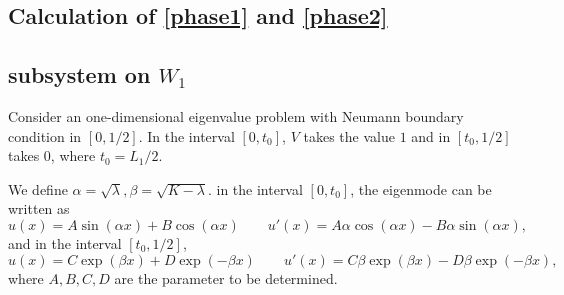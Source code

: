 \documentclass[a4paper,11pt]{article}
\begin{document}
\begin{appendices}
\section{Calculation of \eqref{phase1} and \eqref{phase2}}\label{AppendixC}

\subsection{subsystem on $W_1$}

Consider an one-dimensional eigenvalue problem with Neumann boundary condition in $[0, 1/2]$. In the interval $[0, t_0]$, $V$ takes the value $1$ and in $[t_0, 1/2]$ takes $0$, where $t_0 = L_1/2$.

We define $\alpha = \sqrt{\lambda}, \beta = \sqrt{K - \lambda}$. in the interval $[0, t_0]$, the eigenmode can be written as
\begin{equation*}
u(x) = A \sin(\alpha x) + B \cos(\alpha x) \qquad u'(x) = A \alpha \cos(\alpha x) - B \alpha \sin(\alpha x),
\end{equation*}
and in the interval $[t_0, 1/2]$,
\begin{equation*}
u(x) = C \exp(\beta x) + D \exp(-\beta x) \qquad u'(x) = C \beta \exp(\beta x) - D \beta \exp(-\beta x),
\end{equation*}
where $A ,B, C, D$ are the parameter to be determined.


\end{appendices}
\end{document}
